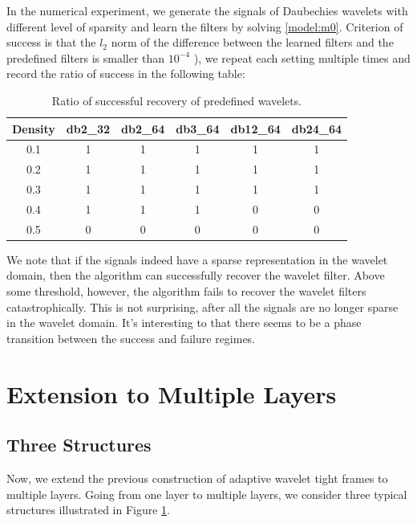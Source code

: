 \documentclass[a4paper]{article}
\begin{document}
In the numerical experiment, we generate the signals of Daubechies wavelets with different level of sparsity and learn the filters by solving \eqref{model:m0}. Criterion of success is that the $l_2$ norm of the difference between the learned filters and the predefined filters is smaller than $10^{-4}$ ), we repeat each setting multiple times and record the ratio of success in the following table:
\begin{table}

\centering
\begin{tabular}{| c | c | c | c| c | c |}

\hline
Density & db2\_32 & db2\_64 & db3\_64 & db12\_64 & db24\_64 \\
\hline
0.1 & 1 & 1 & 1 & 1 & 1 \\
\hline
0.2 & 1 & 1& 1 & 1 & 1 \\
\hline 
0.3 & 1 & 1 & 1 & 1 & 1  \\
\hline
0.4 & 1 & 1 & 1 & 0 & 0  \\
\hline 
0.5 & 0 & 0 & 0 & 0 & 0 \\
\hline

\end{tabular}
\caption{Ratio of successful recovery of predefined wavelets.}
\end{table}
We note that if the signals indeed have a sparse representation in the wavelet domain, then the algorithm can successfully recover the wavelet filter. Above some threshold, however, the algorithm fails to recover the wavelet filters catastrophically. This is not surprising, after all the signals are no longer sparse in the wavelet domain. It's interesting to that there seems to be a phase transition between the success and failure regimes.


\section{Extension to Multiple Layers}
\subsection{Three Structures}
Now, we extend the previous construction of adaptive wavelet tight frames to multiple layers. Going from one layer to multiple layers, we consider three typical structures illustrated in Figure \ref{fig:arch}.
\begin{figure}[h!]

\label{fig:arch}
\end{figure}
\end{document}
